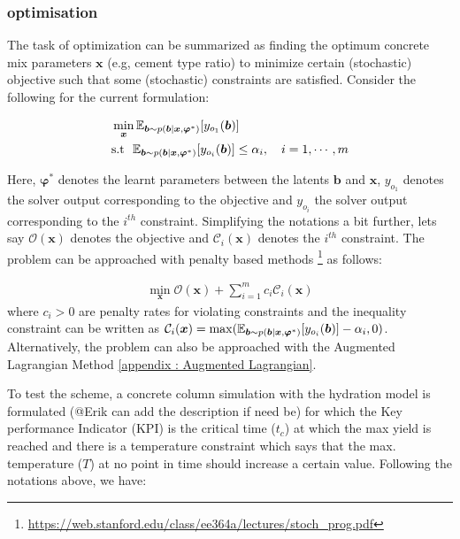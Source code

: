 \documentclass[a4paper,11pt]{article}
\begin{document}
\subsubsection{optimisation}

The task of optimization can be summarized as finding the optimum concrete mix parameters $\bm x$ (e.g, cement type ratio) to minimize certain (stochastic) objective such that some (stochastic) constraints are satisfied. Consider the following for the current formulation:

\begin{align}
	&\min_{\bm x} \mathbb{E}_{\bm b\sim p(\bm b | \bm x, \bm {\varphi}^*)}[y_{o_1}(\bm b)]\\
	&\text{s.t} ~~ \mathbb{E}_{\bm b\sim p(\bm b | \bm x, \bm {\varphi}^*)}[y_{o_i}(\bm b)] \leq \alpha_i, \quad i = 1,\cdots, m
\end{align}

Here, $\bm{\varphi}^*$ denotes the learnt parameters between the latents $\bm b$ and $\bm x$, $y_{o_1}$ denotes the solver output corresponding to the objective and $y_{o_i}$ the solver output corresponding to the $i^{th}$ constraint. Simplifying the notations a bit further, lets say $\mathcal{O}(\bm x)$ denotes the objective and $\mathcal{C}_{i}(\bm x)$ denotes the $i^{th}$ constraint. The problem can be approached with penalty based methods \footnote{\href{https://web.stanford.edu/class/ee364a/lectures/stoch_prog.pdf}{https://web.stanford.edu/class/ee364a/lectures/stoch_prog.pdf}}  as follows:

\begin{align}
	\min_{\bm x} \mathcal{O}(\bm x) + \sum_{i=1}^{m}c_i \mathcal{C}_i(\bm x)
\end{align}
where $c_i>0$ are penalty rates for violating constraints and the inequality constraint can be written as $\mathcal{C}_{i}(\bm x) = \max (\mathbb{E}_{\bm b\sim p(\bm b | \bm x, \bm {\varphi}^*)}[y_{o_i}(\bm b)] - \alpha_i,0)$. Alternatively, the problem can also  be approached with the Augmented Lagrangian Method \ref{appendix : Augmented Lagrangian}.

To test the scheme, a concrete column simulation with the hydration model is formulated \cite{} (@Erik can add the description if need be) for which the Key performance Indicator (KPI) is the critical time ($t_c$) at which the max yield is reached and there is a temperature constraint which says that the max. temperature ($T$) at no point in time should increase a certain value. Following the notations above, we have:
\end{document}
